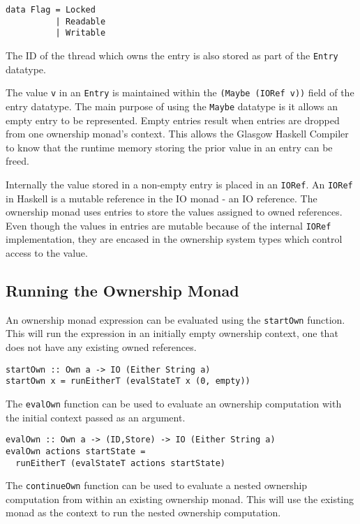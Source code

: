\documentclass[onehalf,11pt]{beavtex}
\begin{document}
\begin{verbatim}
data Flag = Locked
          | Readable
          | Writable
\end{verbatim}

The ID of the thread which owns the entry is also stored as part of the
\texttt{Entry} datatype. 

The value \texttt{v} in an \texttt{Entry} is maintained within the
\texttt{(Maybe (IORef v))} field of the entry datatype.
The main purpose of using the \texttt{Maybe} datatype is it allows an empty entry
to be represented.
Empty entries result when entries are dropped from one ownership monad's
context.  This allows the Glasgow Haskell Compiler to know that
the runtime memory storing the prior value in an entry can be freed.

Internally the value stored in a non-empty entry is placed in an \texttt{IORef}.
An \texttt{IORef} in Haskell is a mutable reference in the IO monad - an IO
reference. %
The ownership monad uses entries to store the values assigned to owned
references.
Even though the values in entries are mutable because of the internal \texttt{IORef}
implementation, they are encased in the ownership system types which control
access to the value.

\subsection{Running the Ownership Monad}

An ownership monad expression can be evaluated using the \texttt{startOwn}
function. This will run the expression in an initially empty ownership context,
one that does not have any existing owned references. 

\begin{verbatim}
startOwn :: Own a -> IO (Either String a)
startOwn x = runEitherT (evalStateT x (0, empty))
\end{verbatim}

The \texttt{evalOwn} function can be used to evaluate an ownership computation
with the initial context passed as an argument.

\begin{verbatim}
evalOwn :: Own a -> (ID,Store) -> IO (Either String a)
evalOwn actions startState =
  runEitherT (evalStateT actions startState)
\end{verbatim}

The \texttt{continueOwn} function can be used to evaluate a nested ownership
computation from within an existing ownership monad.  This will use the
existing monad as the context to run the nested ownership computation. 
\end{document}

